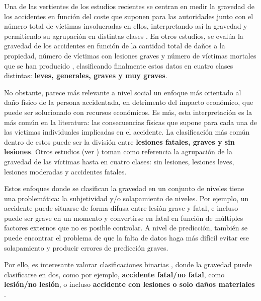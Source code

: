 \documentclass{uathesis-es}
\begin{document}
	
	Una de las vertientes de los estudios recientes se centran en medir la gravedad de los accidentes en función del coste que suponen para las autoridades junto con el número total de víctimas involucradas en ellos, interpretando así la gravedad y permitiendo su agrupación en distintas clases \cite{app7060476}. En otros estudios, se evalúa la gravedad de los accidentes en función de la cantidad total de daños a la propiedad, número de víctimas con lesiones graves y número de víctimas mortales que se han producido \cite{Yang2023}, clasificando finalmente estos datos en cuatro clases distintas: \textbf{leves, generales, graves y muy graves}.
	
	No obstante, parece más relevante a nivel social un enfoque más orientado al daño físico de la persona accidentada, en detrimento del impacto económico, que puede ser solucionado con recursos económicos. Es más, esta interpretación es la más común en la literatura: las consecuencias físicas que supone para cada una de las víctimas individuales implicadas en el accidente. La clasificación más común dentro de estos puede ser la división entre \textbf{lesiones fatales, graves y sin lesiones}. Otros estudios (ver \cite{panicker2022injury}) toman como referencia la agrupación de la gravedad de las víctimas hasta en cuatro clases: sin lesiones, lesiones leves, lesiones moderadas y accidentes fatales.
	
	Estos enfoques donde se clasifican la gravedad en un conjunto de niveles tiene una problemática: la subjetividad y/o solapamiento de niveles. Por ejemplo, un accidente puede situarse de forma difusa entre lesión grave y fatal, e incluso puede ser grave en un momento y convertirse en fatal en función de múltiples factores externos que no es posible controlar. A nivel de predicción, también se puede encontrar el problema de que la falta de datos haga más difícil evitar ese solapamiento y producir errores de predicción graves.
	
	Por ello, es interesante valorar clasificaciones binarias \cite{prati2017using, hosseinzadeh2021investigating}, donde la gravedad puede clasificarse en dos, como por ejemplo, \textbf{accidente fatal/no fatal}, como \textbf{lesión/no lesión}, o incluso \textbf{accidente con lesiones o solo daños materiales }\cite{zhang2022hybrid, ma2021analytic}.
	
	
\end{document}

